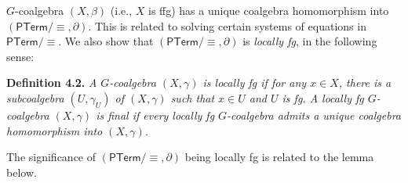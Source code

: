\documentclass[11pt,a4paper]{amsart}
\begin{document}
\hypertarget{html:S4.SS0.SSSx2.p1.m3}{}\({G}\)-coalgebra %
\hypertarget{html:S4.SS0.SSSx2.p1.m4}{}\({(X,\beta)}\) (i.e., %
\hypertarget{html:S4.SS0.SSSx2.p1.m5}{}\({X}\) is ffg) has a unique coalgebra homomorphism into %
\hypertarget{html:S4.SS0.SSSx2.p1.m6}{}\({(\mathsf{PTerm}/{\equiv},\partial)}\). This is related to solving certain systems of equations in %
\hypertarget{html:S4.SS0.SSSx2.p1.m7}{}\({\mathsf{PTerm}/{\equiv}}\). We also show that %
\hypertarget{html:S4.SS0.SSSx2.p1.m8}{}\({(\mathsf{PTerm}/{\equiv},\partial)}\) is \emph{locally fg}, in the following sense:
\par\medskip
\hypertarget{html:S4.Thmtheorem2}{} \par\noindent\textbf{\textbf{Definition 4.2}\textbf{.}}\quad  %
\hypertarget{html:S4.Thmtheorem2.p1}{} \emph{A %
\hypertarget{html:S4.Thmtheorem2.p1.m1}{}\({G}\)-coalgebra %
\hypertarget{html:S4.Thmtheorem2.p1.m2}{}\({(X,\gamma)}\) is \emph{locally fg} if for any %
\hypertarget{html:S4.Thmtheorem2.p1.m3}{}\({x\in X}\), there is a subcoalgebra %
\hypertarget{html:S4.Thmtheorem2.p1.m4}{}\({(U,\gamma_{U})}\) of %
\hypertarget{html:S4.Thmtheorem2.p1.m5}{}\({(X,\gamma)}\) such that %
\hypertarget{html:S4.Thmtheorem2.p1.m6}{}\({x\in U}\) and %
\hypertarget{html:S4.Thmtheorem2.p1.m7}{}\({U}\) is fg. A locally fg %
\hypertarget{html:S4.Thmtheorem2.p1.m8}{}\({G}\)-coalgebra %
\hypertarget{html:S4.Thmtheorem2.p1.m9}{}\({(X,\gamma)}\) is \emph{final} if every locally fg %
\hypertarget{html:S4.Thmtheorem2.p1.m10}{}\({G}\)-coalgebra admits a unique coalgebra homomorphism into %
\hypertarget{html:S4.Thmtheorem2.p1.m11}{}\({(X,\gamma)}\).}
\par\medskip
\hypertarget{html:S4.SS0.SSSx2.p2}{} The significance of %
\hypertarget{html:S4.SS0.SSSx2.p2.m1}{}\({(\mathsf{PTerm}/{\equiv},\partial)}\) being locally fg is related to the lemma below.
\end{document}
